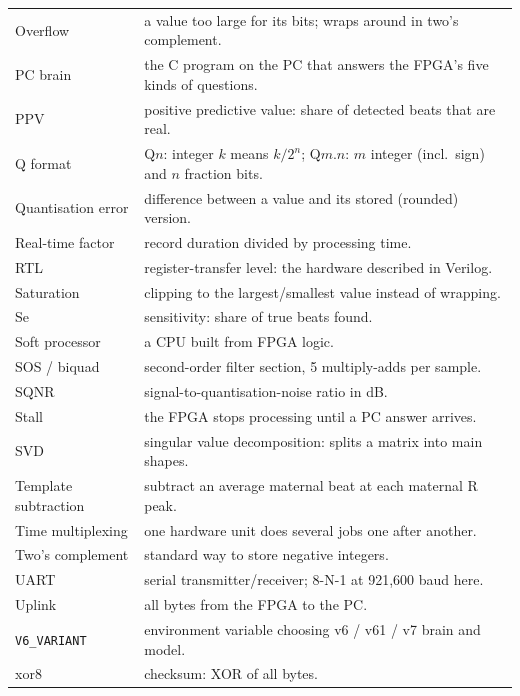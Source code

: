 \documentclass[11pt]{article}
\begin{document}
\begin{center}
\begin{longtable}{@{}p{3.6cm} p{11.4cm}@{}}
Overflow & a value too large for its bits; wraps around in two's complement. \\
PC brain & the C program on the PC that answers the FPGA's five kinds of questions. \\
PPV & positive predictive value: share of detected beats that are real. \\
Q format & Q$n$: integer $k$ means $k/2^n$; Q$m.n$: $m$ integer (incl.\ sign) and $n$ fraction bits. \\
Quantisation error & difference between a value and its stored (rounded) version. \\
Real-time factor & record duration divided by processing time. \\
RTL & register-transfer level: the hardware described in Verilog. \\
Saturation & clipping to the largest/smallest value instead of wrapping. \\
Se & sensitivity: share of true beats found. \\
Soft processor & a CPU built from FPGA logic. \\
SOS / biquad & second-order filter section, 5 multiply-adds per sample. \\
SQNR & signal-to-quantisation-noise ratio in dB. \\
Stall & the FPGA stops processing until a PC answer arrives. \\
SVD & singular value decomposition: splits a matrix into main shapes. \\
Template subtraction & subtract an average maternal beat at each maternal R peak. \\
Time multiplexing & one hardware unit does several jobs one after another. \\
Two's complement & standard way to store negative integers. \\
UART & serial transmitter/receiver; 8-N-1 at 921,600 baud here. \\
Uplink & all bytes from the FPGA to the PC. \\
\texttt{V6\_VARIANT} & environment variable choosing v6 / v61 / v7 brain and model. \\
xor8 & checksum: XOR of all bytes. \\
\bottomrule
\end{longtable}
\end{center}
\end{document}
